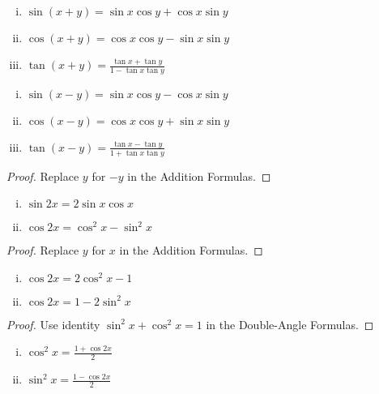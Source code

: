 \documentclass[a4paper,11pt]{article}
\begin{document}
\begin{outline}
    \begin{enumerate}[i.]
      \item \(\sin{(x+y)} = \sin{x}\cos{y} + \cos{x}\sin{y}\)
      \item \(\cos{(x+y)} = \cos{x}\cos{y} - \sin{x}\sin{y}\)
      \item \(\tan{(x+y)} = \frac{\tan{x}+\tan{y}}{1-\tan{x}\tan{y}}\)
    \end{enumerate}
   
  \pagebreak 
    \begin{enumerate}[i.]
      \item \(\sin{(x-y)} = \sin{x}\cos{y} - \cos{x}\sin{y}\)
      \item \(\cos{(x-y)} = \cos{x}\cos{y} + \sin{x}\sin{y}\)
      \item \(\tan{(x-y)} = \frac{\tan{x}-\tan{y}}{1+\tan{x}\tan{y}}\)
    \end{enumerate}
    
    \begin{proof}
      Replace \(y\) for \(-y\) in the Addition Formulas.
    \end{proof}
    
    \begin{enumerate}[i.]
      \item \(\sin{2x} = 2\sin{x}\cos{x}\)
      \item \(\cos{2x} = \cos^2 x - \sin^2 x\)
    \end{enumerate}
    
    \begin{proof}
      Replace \(y\) for \(x\) in the Addition Formulas.
    \end{proof}
    
    \begin{enumerate}[i.]
      \item \(\cos{2x} = 2\cos^2 x - 1\)
      \item \(\cos{2x} = 1 - 2\sin^2 x\)
    \end{enumerate}
    
    \begin{proof}
      Use identity \(\sin^2 x + \cos^2 x = 1\) in the Double-Angle Formulas.
    \end{proof}
    
    \begin{enumerate}[i.]
      \item \(\cos^2 x = \frac{1 + \cos{2x}}{2}\)
      \item \(\sin^2 x = \frac{1 - \cos{2x}}{2}\)
    \end{enumerate}
    

\end{outline}
\end{document}
